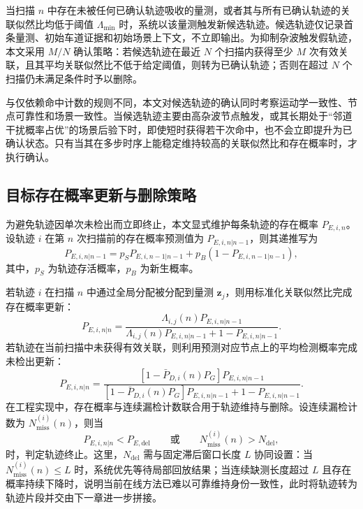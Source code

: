 \documentclass{xdupgthesis}
\begin{document}
当扫描 $n$ 中存在未被任何已确认轨迹吸收的量测，或者其与所有已确认轨迹的关联似然比均低于阈值 $\Lambda_{\min}$ 时，系统以该量测触发新候选轨迹。候选轨迹仅记录首条量测、初始车道证据和初始场景上下文，不立即输出。为抑制杂波触发假轨迹，本文采用 $M/N$ 确认策略：若候选轨迹在最近 $N$ 个扫描内获得至少 $M$ 次有效关联，且其平均关联似然比不低于给定阈值，则转为已确认轨迹；否则在超过 $N$ 个扫描仍未满足条件时予以删除。

与仅依赖命中计数的规则不同，本文对候选轨迹的确认同时考察运动学一致性、节点可靠性和场景一致性。当候选轨迹主要由高杂波节点触发，或其长期处于“邻道干扰概率占优”的场景后验下时，即使短时获得若干次命中，也不会立即提升为已确认状态。只有当其在多步时序上能稳定维持较高的关联似然比和存在概率时，才执行确认。

\subsection{目标存在概率更新与删除策略}

为避免轨迹因单次未检出而立即终止，本文显式维护每条轨迹的存在概率 $P_{E,i,n}$。设轨迹 $i$ 在第 $n$ 次扫描前的存在概率预测值为 $P_{E,i,n|n-1}$，则其递推写为
\begin{equation}
	P_{E,i,n|n-1}=p_S P_{E,i,n-1|n-1}+p_B\left(1-P_{E,i,n-1|n-1}\right),
	\label{eq:ch3_exist_predict_v2}
\end{equation}
其中，$p_S$ 为轨迹存活概率，$p_B$ 为新生概率。

若轨迹 $i$ 在扫描 $n$ 中通过全局分配被分配到量测 $\mathbf z_j$，则用标准化关联似然比完成存在概率更新：
\begin{equation}
	P_{E,i,n|n}=
	\frac{\Lambda_{i,j}(n)P_{E,i,n|n-1}}{\Lambda_{i,j}(n)P_{E,i,n|n-1}+1-P_{E,i,n|n-1}}.
	\label{eq:ch3_exist_hit_v2}
\end{equation}
若轨迹在当前扫描中未获得有效关联，则利用预测对应节点上的平均检测概率完成未检出更新：
\begin{equation}
	P_{E,i,n|n}=
	\frac{\left[1-\bar P_{D,i}(n)P_G\right]P_{E,i,n|n-1}}{\left[1-\bar P_{D,i}(n)P_G\right]P_{E,i,n|n-1}+1-P_{E,i,n|n-1}}.
	\label{eq:ch3_exist_miss_v2}
\end{equation}
在工程实现中，存在概率与连续漏检计数联合用于轨迹维持与删除。设连续漏检计数为 $N_{\mathrm{miss}}^{(i)}(n)$，则当
\begin{equation}
	P_{E,i,n|n}<P_{E,\mathrm{del}}
	\qquad\text{或}\qquad
	N_{\mathrm{miss}}^{(i)}(n)>N_{\mathrm{del}},
	\label{eq:ch3_delete_v2}
\end{equation}
时，判定轨迹终止。这里，$N_{\mathrm{del}}$ 需与固定滞后窗口长度 $L$ 协同设置：当 $N_{\mathrm{miss}}^{(i)}(n)\le L$ 时，系统优先等待局部回放结果；当连续缺测长度超过 $L$ 且存在概率持续下降时，说明当前在线方法已难以可靠维持身份一致性，此时将轨迹转为轨迹片段并交由下一章进一步拼接。
\end{document}
